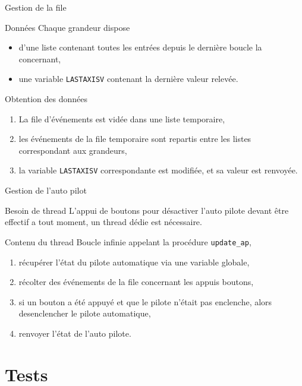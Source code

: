 \documentclass[footheight=2em]{beamer}
\begin{document}
\begin{frame}[t]{Gestion de la file}
  \begin{block}{Données}
    Chaque grandeur dispose
    \begin{itemize}
      \item d'une liste contenant toutes les entrées depuis le dernière boucle
        la concernant,
      \item une variable \texttt{LASTAXISV} contenant la dernière
        valeur relevée.
    \end{itemize}
  \end{block}
  \begin{block}{Obtention des données}
    \begin{enumerate}
      \item La file d'événements est vidée dans une liste temporaire,
      \item les événements de la file temporaire sont repartis entre les listes
        correspondant aux grandeurs,
      \item la variable \texttt{LASTAXISV} correspondante est modifiée, et sa
        valeur est renvoyée.
    \end{enumerate}
  \end{block}
\end{frame}

\begin{frame}[t]{Gestion de l'auto pilot}
  \begin{block}{Besoin de thread}
    L'appui de boutons pour désactiver l'auto pilote devant être effectif a tout
    moment, un thread dédie est nécessaire.
  \end{block}
  \begin{block}{Contenu du thread}
    Boucle infinie appelant la procédure \texttt{update\_ap},
    \begin{enumerate}
      \item récupérer l'état du pilote automatique via une variable
        globale,
      \item récolter des événements de la file concernant les appuis boutons,
      \item si un bouton a été appuyé et que le pilote n'était pas enclenche,
        alors desenclencher le pilote automatique,
      \item renvoyer l'état de l'auto pilote.
    \end{enumerate}
  \end{block}
\end{frame}


\section{Tests}
\end{document}
